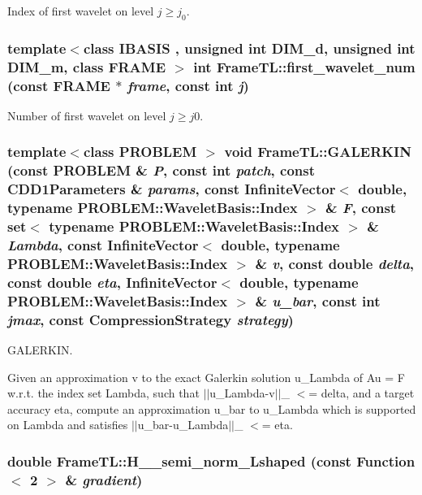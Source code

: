 Index of first wavelet on level $j \geq j_0$. \hypertarget{namespaceFrameTL_d2a45d507a64c17ff1cf1edeb7afcd8e}{
\subsubsection[{first\_\-wavelet\_\-num}]{\setlength{\rightskip}{0pt plus 5cm}template$<$class IBASIS , unsigned int DIM\_\-d, unsigned int DIM\_\-m, class FRAME $>$ int FrameTL::first\_\-wavelet\_\-num (const FRAME $\ast$ {\em frame}, \/  const int {\em j})}}
\label{namespaceFrameTL_d2a45d507a64c17ff1cf1edeb7afcd8e}


Number of first wavelet on level $j \geq j0$. \hypertarget{namespaceFrameTL_5338ae7f2ce93a8449560cc020fa212a}{
\subsubsection[{GALERKIN}]{\setlength{\rightskip}{0pt plus 5cm}template$<$class PROBLEM $>$ void FrameTL::GALERKIN (const PROBLEM \& {\em P}, \/  const int {\em patch}, \/  const CDD1Parameters \& {\em params}, \/  const InfiniteVector$<$ double, typename PROBLEM::WaveletBasis::Index $>$ \& {\em F}, \/  const set$<$ typename PROBLEM::WaveletBasis::Index $>$ \& {\em Lambda}, \/  const InfiniteVector$<$ double, typename PROBLEM::WaveletBasis::Index $>$ \& {\em v}, \/  const double {\em delta}, \/  const double {\em eta}, \/  InfiniteVector$<$ double, typename PROBLEM::WaveletBasis::Index $>$ \& {\em u\_\-bar}, \/  const int {\em jmax}, \/  const CompressionStrategy {\em strategy})}}
\label{namespaceFrameTL_5338ae7f2ce93a8449560cc020fa212a}


GALERKIN. 

Given an approximation v to the exact Galerkin solution u\_\-Lambda of Au = F w.r.t. the index set Lambda, such that $|$$|$u\_\-Lambda-v$|$$|$\_ $<$= delta, and a target accuracy eta, compute an approximation u\_\-bar to u\_\-Lambda which is supported on Lambda and satisfies $|$$|$u\_\-bar-u\_\-Lambda$|$$|$\_ $<$= eta. \hypertarget{namespaceFrameTL_3ce808a3f26fc1938139488a730e994d}{
\subsubsection[{H\_\-1\_\-semi\_\-norm\_\-Lshaped}]{\setlength{\rightskip}{0pt plus 5cm}double FrameTL::H\_\_\-semi\_\-norm\_\-Lshaped (const Function$<$ 2 $>$ \& {\em gradient})}}
\label{namespaceFrameTL_3ce808a3f26fc1938139488a730e994d}


